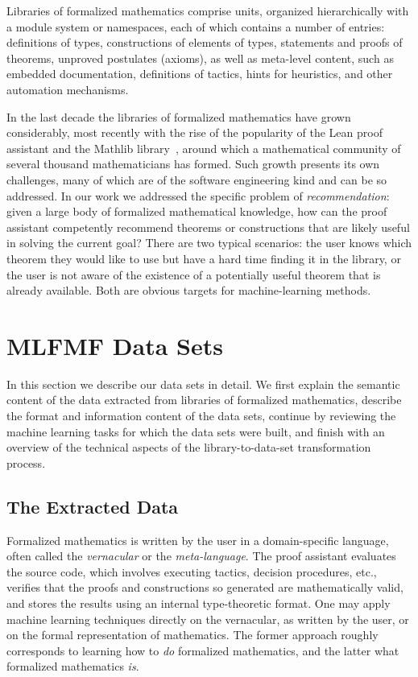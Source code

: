 \documentclass{article}
\begin{document}
Libraries of formalized mathematics comprise units, organized hierarchically with a module system or namespaces, each of which contains a number of entries: definitions of types, constructions of elements of types, statements and proofs of theorems, unproved postulates (axioms), as well as meta-level content, such as embedded documentation, definitions of tactics, hints for heuristics, and other automation mechanisms.

In the last decade the libraries of formalized mathematics have grown considerably, most recently with the rise of the popularity of the Lean proof assistant and the Mathlib library~\citep{mathlib,mathlib-preprint}, around which a mathematical community of several thousand mathematicians has formed. Such growth presents its own challenges, many of which are of the software engineering kind and can be so addressed. In our work we addressed the specific problem of \emph{recommendation}: given a large body of formalized mathematical knowledge, how can the proof assistant competently recommend theorems or constructions that are likely useful in solving the current goal? There are two typical scenarios: the user knows which theorem they would like to use but have a hard time finding it in the library, or the user is not aware of the existence of a potentially useful theorem that is already available. Both are obvious targets for machine-learning methods.


\section{MLFMF Data Sets}

In this section we describe our data sets in detail. We first explain the semantic content of the data extracted from libraries of formalized mathematics, describe the format and information content of the data sets, continue by reviewing the machine learning tasks for which the data sets were built, and finish with an overview of the technical aspects of the library-to-data-set transformation process.

\subsection{The Extracted Data}

Formalized mathematics is written by the user in a domain-specific language, often called the \emph{vernacular} or the \emph{meta-language}. The proof assistant evaluates the source code, which involves executing tactics, decision procedures, etc., verifies that the proofs and constructions so generated are mathematically valid, and stores the results using an internal type-theoretic format. One may apply machine learning techniques directly on the vernacular, as written by the user, or on the formal representation of mathematics. The former approach roughly corresponds to learning how to \emph{do} formalized mathematics, and the latter what formalized mathematics \emph{is}.
\end{document}
